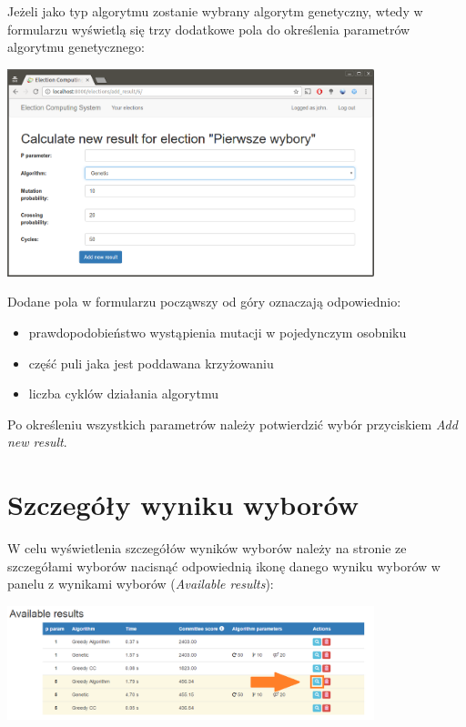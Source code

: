 \documentclass[pdflatex,11pt]{../aghdoc_version2}
\begin{document}
\newpage
Jeżeli jako typ algorytmu zostanie wybrany algorytm genetyczny, wtedy w formularzu wyświetlą się trzy dodatkowe pola do określenia parametrów algorytmu genetycznego: \\

\begin{center}
\includegraphics[width=0.8\textwidth]{pics/new-result-genetic.png}
\end{center}

\vspace{\baselineskip}
Dodane pola w formularzu począwszy od góry oznaczają odpowiednio: 
\begin{itemize}
\item prawdopodobieństwo wystąpienia mutacji w pojedynczym osobniku
\item część puli jaka jest poddawana krzyżowaniu
\item liczba cyklów działania algorytmu
\end{itemize}

Po określeniu wszystkich parametrów należy potwierdzić wybór przyciskiem \textit{Add new result}.
\newpage

\section{Szczegóły wyniku wyborów}
\label{sec:szczegolywyniku}

W celu wyświetlenia szczegółów wyników wyborów należy na stronie ze szczegółami wyborów nacisnąć odpowiednią ikonę danego wyniku wyborów w panelu z wynikami wyborów (\textit{Available results}): \\

\begin{center}
\includegraphics[width=0.8\textwidth]{pics/result_details_button.png}
\end{center} 
\end{document}
